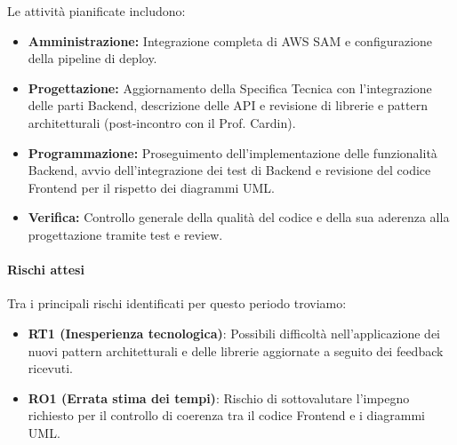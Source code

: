 \documentclass[a4paper,12pt]{article}
\begin{document}
Le attività pianificate includono:
\begin{itemize}
    \item \textbf{Amministrazione:} Integrazione completa di AWS SAM e configurazione della pipeline di deploy.
    \item \textbf{Progettazione:} Aggiornamento della Specifica Tecnica con l'integrazione delle parti Backend, descrizione delle API e revisione di librerie e pattern architetturali (post-incontro con il Prof. Cardin).
    \item \textbf{Programmazione:} Proseguimento dell'implementazione delle funzionalità Backend, avvio dell'integrazione dei test di Backend e revisione del codice Frontend per il rispetto dei diagrammi UML.
    \item \textbf{Verifica:} Controllo generale della qualità del codice e della sua aderenza alla progettazione tramite test e review.
\end{itemize}

\paragraph{Rischi attesi}
Tra i principali rischi identificati per questo periodo troviamo:
\begin{itemize}
    \item \textbf{RT1 (Inesperienza tecnologica)}: Possibili difficoltà nell'applicazione dei nuovi pattern architetturali e delle librerie aggiornate a seguito dei feedback ricevuti.
    \item \textbf{RO1 (Errata stima dei tempi)}: Rischio di sottovalutare l'impegno richiesto per il controllo di coerenza tra il codice Frontend e i diagrammi UML.
\end{itemize}
\end{document}
